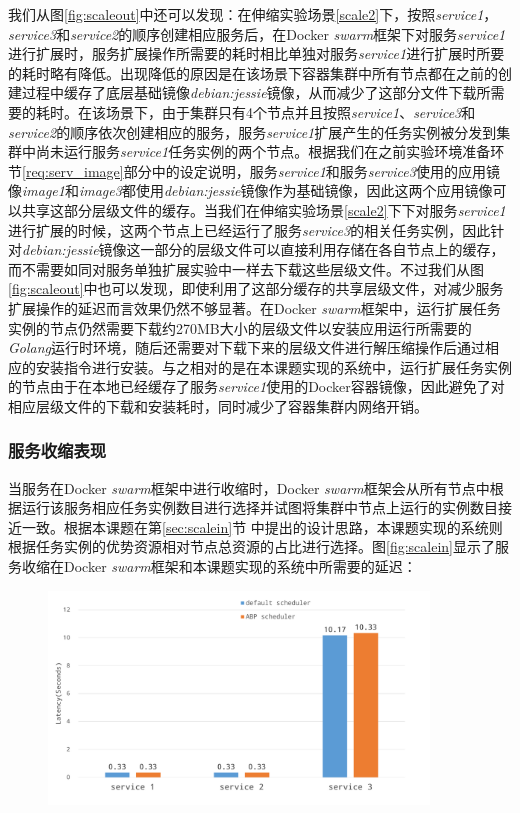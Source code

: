 我们从图\ref{fig:scaleout}中还可以发现：在伸缩实验场景\ref{scale2}下，按照\emph{service1}，\emph{service3}和\emph{service2}的顺序创建相应服务后，在Docker \emph{swarm}框架下对服务\emph{service1}进行扩展时，服务扩展操作所需要的耗时相比单独对服务\emph{service1}进行扩展时所要的耗时略有降低。出现降低的原因是在该场景下容器集群中所有节点都在之前的创建过程中缓存了底层基础镜像\emph{debian:jessie}镜像，从而减少了这部分文件下载所需要的耗时。在该场景下，由于集群只有4个节点并且按照\emph{service1}、\emph{service3}和\emph{service2}的顺序依次创建相应的服务，服务\emph{service1}扩展产生的任务实例被分发到集群中尚未运行服务\emph{service1}任务实例的两个节点。根据我们在之前实验环境准备环节\ref{req:serv_image}部分中的设定说明，服务\emph{service1}和服务\emph{service3}使用的应用镜像\emph{image1}和\emph{image3}都使用\emph{debian:jessie}镜像作为基础镜像，因此这两个应用镜像可以共享这部分层级文件的缓存。当我们在伸缩实验场景\ref{scale2}下下对服务\emph{service1}进行扩展的时候，这两个节点上已经运行了服务\emph{service3}的相关任务实例，因此针对\emph{debian:jessie}镜像这一部分的层级文件可以直接利用存储在各自节点上的缓存，而不需要如同对服务单独扩展实验中一样去下载这些层级文件。不过我们从图\ref{fig:scaleout}中也可以发现，即使利用了这部分缓存的共享层级文件，对减少服务扩展操作的延迟而言效果仍然不够显著。在Docker \emph{swarm}框架中，运行扩展任务实例的节点仍然需要下载约270MB大小的层级文件以安装应用运行所需要的\emph{Golang}运行时环境，随后还需要对下载下来的层级文件进行解压缩操作后通过相应的安装指令进行安装。与之相对的是在本课题实现的系统中，运行扩展任务实例的节点由于在本地已经缓存了服务\emph{service1}使用的Docker容器镜像，因此避免了对相应层级文件的下载和安装耗时，同时减少了容器集群内网络开销。

\subsubsection{服务收缩表现}
当服务在Docker \emph{swarm}框架中进行收缩时，Docker \emph{swarm}框架会从所有节点中根据运行该服务相应任务实例数目进行选择并试图将集群中节点上运行的实例数目接近一致。根据本课题在第\ref{sec:scalein}节
中提出的设计思路，本课题实现的系统则根据任务实例的优势资源相对节点总资源的占比进行选择。图\ref{fig:scalein}显示了服务收缩在Docker \emph{swarm}框架和本课题实现的系统中所需要的延迟：
\begin{figure}[H]
\centering
\includegraphics[width=0.9\textwidth]{./figure/scalein}
\end{figure}

